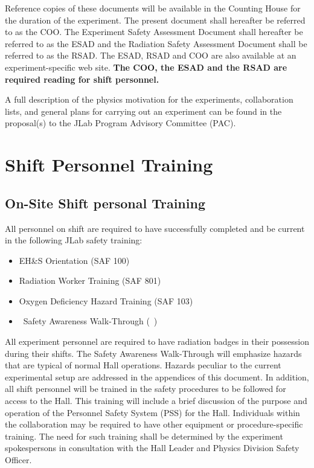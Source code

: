 \documentclass[11pt]{article}
\begin{document}

Reference copies of these documents will be available in the Counting 
House for the duration of the experiment. The present document shall 
hereafter be referred to as the COO. The Experiment Safety Assessment 
Document shall hereafter be referred to as the ESAD and the
Radiation Safety Assessment Document shall be referred to as the RSAD.
The ESAD, RSAD and COO are also available at an experiment-specific 
web site. {\bf The COO, the ESAD and the RSAD are required reading for 
shift personnel.}

A full description of the physics motivation for the experiments, collaboration 
lists, and general plans for carrying out an experiment can be found in the
proposal(s) to the JLab Program Advisory Committee (PAC). 

\section{Shift Personnel Training}
\indent
\subsection{On-Site Shift personal Training}

All personnel on shift are required to have successfully completed and be 
current in the following JLab safety training:

\begin{itemize}

\item EH\&S Orientation (SAF 100) 

\item Radiation Worker Training (SAF 801) 

\item Oxygen Deficiency Hazard Training (SAF 103) 

\item \HALL\ Safety Awareness Walk-Through (\AWARENESS\ )

\end{itemize}

 All experiment personnel are 
required to have radiation badges in their possession during their shifts. 
The Safety Awareness Walk-Through will
emphasize hazards that are typical of normal Hall operations.
Hazards  peculiar to the current experimental setup are addressed in the appendices 
of this document. 
In addition, all shift personnel will be trained in the safety procedures to be
followed for access to the Hall. This
training will include a brief discussion of the purpose and operation of the
Personnel Safety System (PSS) for the Hall. 
Individuals within the collaboration may be required to have other equipment 
or procedure-specific training. The need for such
training shall be determined by the experiment spokespersons in consultation 
with the Hall Leader and Physics Division Safety Officer.
\end{document}
